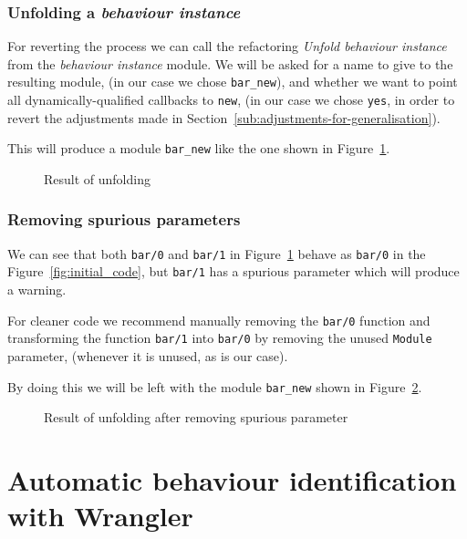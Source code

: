 \subsubsection{Unfolding a \emph{behaviour instance}}

For reverting the process we can call the refactoring \emph{Unfold
behaviour instance} from the \emph{behaviour instance} module. We
will be asked for a name to give to the resulting module, (in our
case we chose \texttt{bar\_new}), and whether we want to point all
dynamically-qualified callbacks to \texttt{new}, (in our case we chose
\texttt{yes}, in order to revert the adjustments made in 
Section~\ref{sub:adjustments-for-generalisation}).

This will produce a module \texttt{bar\_new} like the one shown in
Figure~\ref{fig:unfold_result}.

\begin{figure}

\caption{Result of unfolding\label{fig:unfold_result}}
\end{figure}



\subsubsection{Removing spurious parameters}

We can see that both \texttt{bar/0} and \texttt{bar/1} in 
Figure~\ref{fig:unfold_result}
behave as \texttt{bar/0} in the Figure~\ref{fig:initial_code}, but
\texttt{bar/1} has a spurious parameter which will produce a warning.

For cleaner code we recommend manually removing the \texttt{bar/0}
function and transforming the function \texttt{bar/1} into \texttt{bar/0}
by removing the unused \texttt{Module} parameter, (whenever it is
unused, as is our case).

By doing this we will be left with the module \texttt{bar\_new} shown
in Figure~\ref{fig:final_result}.

\begin{figure}

\caption{Result of unfolding after removing spurious 
parameter\label{fig:final_result}}
\end{figure}

\section{Automatic behaviour identification with Wrangler}
\label{sec:identification}

